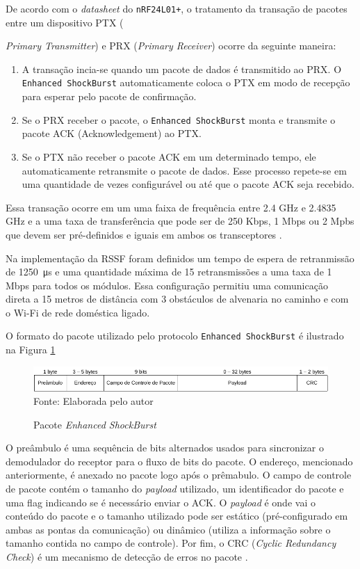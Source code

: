 De acordo com o \textit{datasheet} do \texttt{nRF24L01+}, o tratamento da transação de pacotes entre um
dispositivo PTX ({\textit{Primary Transmitter}) e PRX (\textit{Primary Receiver}) ocorre da
seguinte maneira:

\begin{enumerate}
	\item A transação incia-se quando um pacote de dados é transmitido ao PRX. O
		\texttt{Enhanced ShockBurst} automaticamente coloca o PTX em modo de recepção para esperar
		pelo pacote de confirmação.
	\item Se o PRX receber o pacote, o \texttt{Enhanced ShockBurst} monta e transmite o pacote ACK
		(Acknowledgement) ao PTX.
	\item Se o PTX não receber o pacote ACK em um determinado tempo, ele automaticamente retransmite o
		pacote de dados. Esse processo repete-se em uma quantidade de vezes configurável ou até que o
		pacote ACK seja recebido.
\end{enumerate}

Essa transação ocorre em um uma faixa de frequência entre 2.4 GHz e 2.4835 GHz e a uma taxa de transferência
que pode ser de 250 Kbps, 1 Mbps ou 2 Mpbs que devem ser pré-definidos e iguais em ambos os
transceptores \cite{nrfdatasheet}.

Na implementação da RSSF foram definidos um tempo de espera de retranmissão de \SI{1250}{\micro \second} e uma
quantidade máxima de 15 retransmissões a uma taxa de 1 Mbps para todos os módulos. Essa configuração
permitiu uma comunicação direta a 15 metros de distância com 3 obstáculos de alvenaria no caminho e com o
Wi-Fi de rede doméstica ligado.

O formato do pacote utilizado pelo protocolo \texttt{Enhanced ShockBurst} é ilustrado na Figura
\ref{figura:package}

\begin{figure}[h!]
	\caption{Pacote \textit{Enhanced ShockBurst}}
	\centering
	\includegraphics[scale=0.5]{../images/pacote.png}
	\hspace{\linewidth}
	Fonte: Elaborada pelo autor
	\label{figura:package}
\end{figure}

O preâmbulo é uma sequência de bits alternados usados para sincronizar o demodulador do receptor para o fluxo
de bits do pacote. O endereço, mencionado anteriormente, é anexado no pacote logo após o prêmabulo. O campo de
controle de pacote contém o tamanho do \textit{payload} utilizado, um identificador do pacote e uma flag
indicando se é necessário enviar o ACK. O \textit{payload} é onde vai o conteúdo do pacote e o tamanho
utilizado pode ser estático (pré-configurado em ambas as pontas da comunicação) ou dinâmico (utiliza a
informação sobre o tamanho contida no campo de controle). Por fim, o CRC (\textit{Cyclic Redundancy Check}) é
um mecanismo de detecção de erros no pacote \cite{nrfdatasheet}.

}
